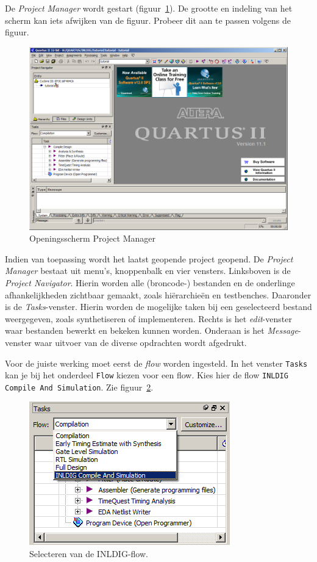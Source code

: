 \documentclass[a4paper,12pt,fleqn,twoside]{book}
\def\tutpicscale{0.455}
\newcommand{\naam}[1]{\texttt{#1}}
\begin{document}
De \textsl{Project Manager} wordt gestart
(figuur~\ref{fig:012quartusstartupscreen}).
De grootte en indeling van het scherm kan iets afwijken van de figuur. Probeer
dit aan te passen volgens de figuur. 

\begin{figure}[H]
\centering
\includegraphics[scale=\tutpicscale]{012quartusstartupscreen}
\caption{Openingsscherm Project Manager}
\label{fig:012quartusstartupscreen}
\end{figure}

Indien van toepassing wordt het laatst geopende project geopend. De
\textsl{Project Manager} bestaat uit menu's, knoppenbalk en vier vensters.
Linksboven is de \textsl{Project Navigator}. Hierin worden alle (broncode-)%
bestanden en de onderlinge afhankelijkheden zichtbaar gemaakt, zoals
hi\"{e}rarchie\"{e}n en testbenches. Daaronder is de \textsl{Tasks}-venster.
Hierin worden de mogelijke taken bij een geselecteerd bestand weergegeven,
zoals synthetiseren of implementeren. Rechts is het \textsl{edit}-venster
waar bestanden bewerkt en bekeken kunnen worden. Onderaan is het
\textsl{Message}-venster waar uitvoer van de diverse opdrachten wordt
afgedrukt.

Voor de juiste werking moet eerst de \textsl{flow} worden ingesteld. In het
venster \naam{Tasks} kan je bij het onderdeel \naam{Flow} kiezen voor een
flow. Kies hier de flow \naam{INLDIG Compile And Simulation}.
Zie figuur~\ref{fig:013chooseinldigflow}.

\begin{figure}[H]
\centering
\includegraphics[scale=\tutpicscale]{013chooseinldigflow}
\caption{Selecteren van de INLDIG-flow.}
\label{fig:013chooseinldigflow}
\end{figure}
\end{document}
